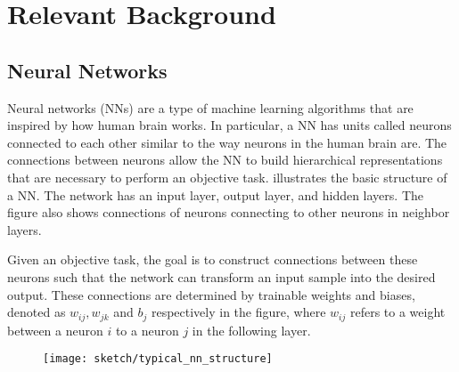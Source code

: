 \chapter{Relevant Background}
\label{cha:chapter3}

\section{Neural Networks}
Neural networks (NNs) are a type of machine learning algorithms that are inspired by how human brain works.  In particular, a NN has units called neurons connected to each other similar to the way neurons in the human brain are. The connections between neurons allow the NN to build hierarchical representations that are necessary to perform an objective task. \addfigure{\ref{fig:nn_typical_structure}} illustrates the basic structure of a NN. The network has an input layer, output layer, and hidden layers. The figure also shows connections of neurons connecting to other neurons in neighbor layers. 

Given an objective task, the goal is to construct connections between these neurons such that the network can transform an input sample into the desired output.  These connections are determined by trainable weights and biases, denoted as $w_{ij}, w_{jk}$ and $b_j$ respectively in the figure, where $w_{ij}$ refers to a weight between a neuron $i$ to a neuron $j$ in the following layer.


%
%
%

 \begin{figure}
    \begin{center}

\texttt{[image: sketch/typical\_nn\_structure]}
\label{fig:nn_typical_structure}

\end{center}
\end{figure}


